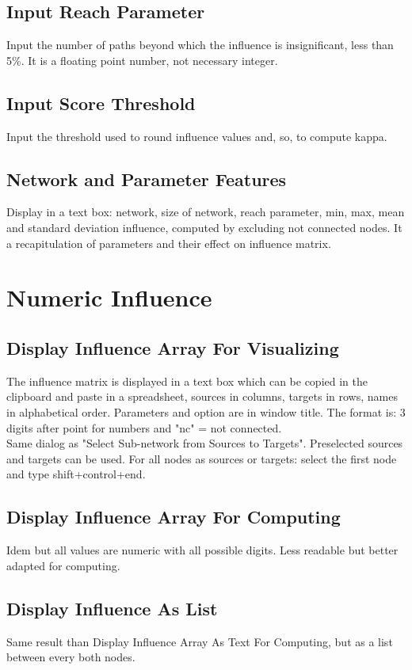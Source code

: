 \documentclass[11pt]{article}
\begin{document}
\subsection{Input Reach Parameter}
Input the number of paths beyond which the influence is insignificant, less than 5\%. It is a floating point number, not necessary integer.

\subsection{Input Score Threshold}
Input the threshold used to round influence values and, so, to compute kappa. 

\subsection{Network and Parameter Features}
Display in a text box: network, size of network, reach parameter, min, max, mean and standard deviation influence, computed by excluding not connected nodes. It a recapitulation of parameters and their effect on influence matrix.

\section{Numeric Influence}

\subsection{Display Influence Array For Visualizing}
The influence matrix is displayed in a text box which can be copied in the clipboard and paste in a spreadsheet, sources in columns, targets in rows, names in alphabetical order. Parameters and option are in window title. The format is: 3 digits after point for numbers and "nc" = not connected.\\
Same dialog as "Select Sub-network from Sources to Targets". Preselected sources and targets can be used.  For all nodes as sources or targets: select the first node and type shift+control+end.

\subsection{Display Influence Array For Computing}
Idem but all values are numeric with all possible digits. Less readable but better adapted for computing.

\subsection{Display Influence As List}
Same result than Display Influence Array As Text For Computing, but as a list between every both nodes.
\end{document}
